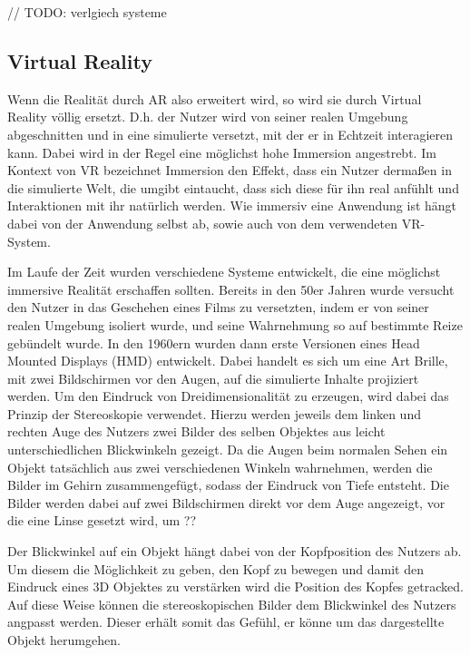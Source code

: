 // TODO:
verlgiech systeme


\subsection{Virtual Reality}

Wenn die Realität durch AR also erweitert wird, so wird sie durch Virtual Reality völlig ersetzt. D.h. der Nutzer wird von seiner realen Umgebung abgeschnitten und in eine simulierte versetzt, mit der er in Echtzeit 
interagieren kann. Dabei wird in der Regel eine möglichst hohe Immersion angestrebt. 
Im Kontext von VR bezeichnet Immersion den Effekt, dass ein Nutzer dermaßen in die simulierte Welt, die umgibt eintaucht, dass sich diese für ihn real anfühlt und Interaktionen mit ihr natürlich werden. Wie immersiv eine Anwendung ist hängt dabei von der Anwendung selbst ab, sowie auch von dem verwendeten VR-System. 

Im Laufe der Zeit wurden verschiedene Systeme entwickelt, die eine möglichst immersive Realität erschaffen sollten. 
Bereits in den 50er Jahren wurde versucht den Nutzer in das Geschehen eines Films zu versetzten, indem er von seiner realen Umgebung isoliert wurde, und seine Wahrnehmung so auf bestimmte Reize gebündelt wurde. %
In den 1960ern wurden dann erste Versionen eines Head Mounted Displays (HMD) entwickelt. %
Dabei handelt es sich um eine Art Brille, mit zwei Bildschirmen vor den Augen, auf die simulierte Inhalte projiziert werden.
Um den Eindruck von Dreidimensionalität zu erzeugen, wird dabei das Prinzip der Stereoskopie verwendet. Hierzu werden jeweils dem linken und rechten Auge des Nutzers zwei Bilder des selben Objektes aus leicht unterschiedlichen Blickwinkeln  gezeigt. Da die Augen beim normalen Sehen ein Objekt tatsächlich aus zwei verschiedenen Winkeln wahrnehmen, werden die Bilder im Gehirn zusammengefügt, sodass der Eindruck von Tiefe entsteht. Die Bilder werden dabei auf zwei Bildschirmen direkt vor dem Auge angezeigt, vor die eine Linse gesetzt wird, um ??

Der Blickwinkel auf ein Objekt hängt dabei von der Kopfposition des Nutzers ab. Um diesem die Möglichkeit zu geben, den Kopf zu bewegen und damit den Eindruck eines 3D Objektes zu verstärken wird die Position des Kopfes getracked. Auf diese Weise können die stereoskopischen Bilder dem Blickwinkel des Nutzers angpasst werden. Dieser erhält somit das Gefühl, er könne um das dargestellte Objekt herumgehen. 

